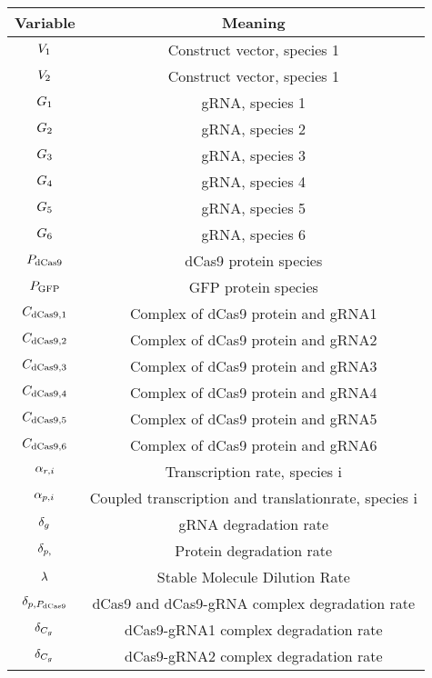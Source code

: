 \begin{center}
    \begin{tabular}{|c|c|}
    \hline
    Variable & Meaning \\
    \hline
    
        $V_{1}$ & Construct vector, species 1 \\
        $V_{2}$ & Construct vector, species 1 \\
        $G_{1}$ & gRNA, species 1 \\
        $G_{2}$ & gRNA, species 2 \\
        $G_{3}$ & gRNA, species 3 \\
        $G_{4}$ & gRNA, species 4 \\
        $G_{5}$ & gRNA, species 5 \\
        $G_{6}$ & gRNA, species 6 \\
        $P_{\text{dCas9}{}}$ & dCas9 protein species \\
        $P_{\text{GFP}}$ & GFP protein species \\
        $C_{\text{dCas9},1}$ & Complex of dCas9 protein and gRNA1 \\
        $C_{\text{dCas9},2}$ & Complex of dCas9 protein and gRNA2 \\
        $C_{\text{dCas9},3}$ & Complex of dCas9 protein and gRNA3 \\
        $C_{\text{dCas9},4}$ & Complex of dCas9 protein and gRNA4 \\
        $C_{\text{dCas9},5}$ & Complex of dCas9 protein and gRNA5 \\
        $C_{\text{dCas9},6}$ & Complex of dCas9 protein and gRNA6 \\
        $\alpha_{r,i}$ & Transcription rate, species i \\
        $\alpha_{p,i}$ & Coupled transcription and translationrate, species i \\
        $\delta_g{}$ & gRNA degradation rate \\
        $\delta_{p,}$ & Protein degradation rate \\
        $\lambda{}$ & Stable Molecule Dilution Rate \\
        $\delta_{p,P_{\text{dCas9}{}}}$ & dCas9 and dCas9-gRNA complex degradation rate \\
        $\delta_{C_g}{}$ & dCas9-gRNA1 complex degradation rate \\
        $\delta_{C_g}{}$ & dCas9-gRNA2 complex degradation rate \\

\end{tabular}
\end{center}
